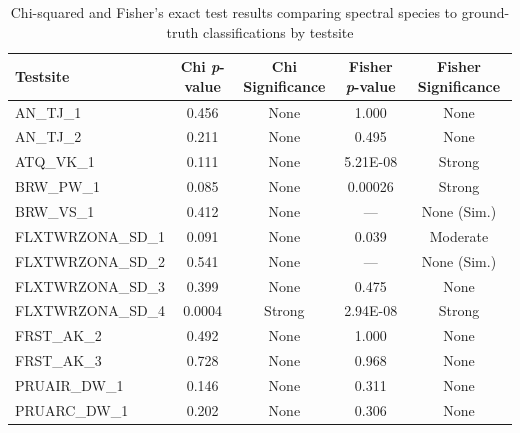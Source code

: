 







\begin{table}[ht]
\centering
\caption{Chi-squared and Fisher's exact test results comparing spectral species to ground-truth classifications by testsite}
\begin{tabular}{lcccc}
\hline
\textbf{Testsite} & \textbf{Chi \textit{p}-value} & \textbf{Chi Significance} & \textbf{Fisher \textit{p}-value} & \textbf{Fisher Significance} \\
\hline
AN\_TJ\_1            & 0.456 & None   & 1.000         & None          \\
AN\_TJ\_2            & 0.211 & None   & 0.495         & None          \\
ATQ\_VK\_1           & 0.111 & None   & 5.21E-08      & Strong        \\
BRW\_PW\_1           & 0.085 & None   & 0.00026       & Strong        \\
BRW\_VS\_1           & 0.412 & None   & ---           & None (Sim.)   \\
FLXTWRZONA\_SD\_1    & 0.091 & None   & 0.039         & Moderate      \\
FLXTWRZONA\_SD\_2    & 0.541 & None   & ---           & None (Sim.)   \\
FLXTWRZONA\_SD\_3    & 0.399 & None   & 0.475         & None          \\
FLXTWRZONA\_SD\_4    & 0.0004 & Strong & 2.94E-08     & Strong        \\
FRST\_AK\_2          & 0.492 & None   & 1.000         & None          \\
FRST\_AK\_3          & 0.728 & None   & 0.968         & None          \\
PRUAIR\_DW\_1        & 0.146 & None   & 0.311         & None          \\
PRUARC\_DW\_1        & 0.202 & None   & 0.306         & None          \\
\hline
\end{tabular}
\label{tab:chi_fisher_results}
\end{table}


